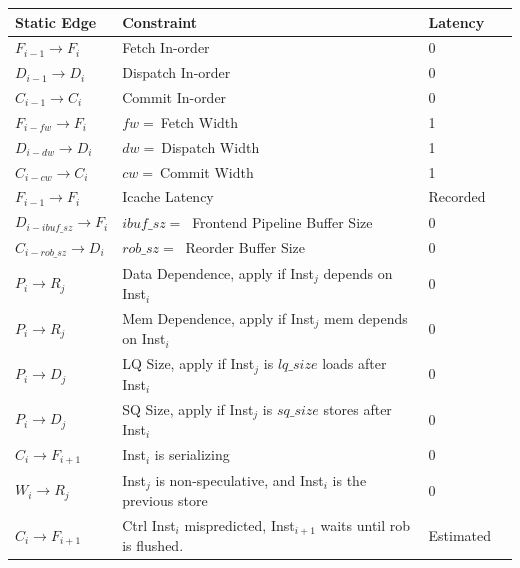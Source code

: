\begin{table}
\begin{center}

\scriptsize
\def\arraystretch{0.9}
\setlength{\tabcolsep}{.19em}
    \begin{tabular}{llll}  \toprule
    \textbf{Static Edge} & \textbf{Constraint} & \textbf{Latency} \\ \midrule
    $F_{i-1}\rightarrow F_{i}$ & Fetch In-order & 0 \\
    $D_{i-1}\rightarrow D_{i}$ & Dispatch In-order & 0 \\
    $C_{i-1}\rightarrow C_{i}$ & Commit In-order & 0 \\ 
    $F_{i-fw}\rightarrow F_{i}$ & $fw=~$Fetch Width & 1 \\
    $D_{i-dw}\rightarrow D_{i}$ & $dw=~$Dispatch Width & 1 \\
    $C_{i-cw}\rightarrow C_{i}$ & $cw=~$Commit Width & 1 \\ 
    $F_{i-1}\rightarrow F_{i}$ & Icache Latency & Recorded \\


\rowcolor{CNew}
    $D_{i-ibuf\_sz}\rightarrow F_{i}$ & $ibuf\_sz=~$ Frontend Pipeline Buffer Size & 0 \\

    $C_{i-{rob\_sz}}\rightarrow D_{i}$ & $rob\_sz=~$ Reorder Buffer Size  & 0 \\ 

    $P_{i}\rightarrow R_{j}$ & Data Dependence, apply if Inst$_j$ depends on Inst$_i$ & 0 \\ 
    $P_{i}\rightarrow R_{j}$ & Mem Dependence, apply if Inst$_j$ mem depends on Inst$_i$ & 0 \\ 

\rowcolor{CNew}
    $P_{i}\rightarrow D_{j}$ & LQ Size, apply if Inst$_j$ is $lq\_size$ loads after Inst$_i$ & 0 \\ 
\rowcolor{CNew}
    $P_{i}\rightarrow D_{j}$ & SQ Size, apply if Inst$_j$ is $sq\_size$ stores after Inst$_i$ & 0 \\ 

\rowcolor{CNew}
    $C_{i}\rightarrow F_{i+1}$ & Inst$_i$ is serializing & 0 \\ 
\rowcolor{CNew}
    $W_{i}\rightarrow R_{j}$ & Inst$_j$ is non-speculative, and Inst$_{i}$ is the previous store  & 0 \\ 

    $C_{i}\rightarrow F_{i+1}$ & Ctrl Inst$_i$ mispredicted, Inst$_{i+1}$ waits until rob is flushed. & Estimated \\


\end{tabular}
\end{center}
\end{table}
